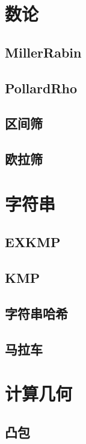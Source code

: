 \documentclass{article}
\begin{document}
\begin{multicols*}{2}
\section{数论}
\subsection{MillerRabin}

\subsection{PollardRho}

\subsection{区间筛}

\subsection{欧拉筛}

\section{字符串}
\subsection{EXKMP}

\subsection{KMP}

\subsection{字符串哈希}

\subsection{马拉车}

\section{计算几何}
\subsection{凸包}


\end{multicols*}
\end{document}
